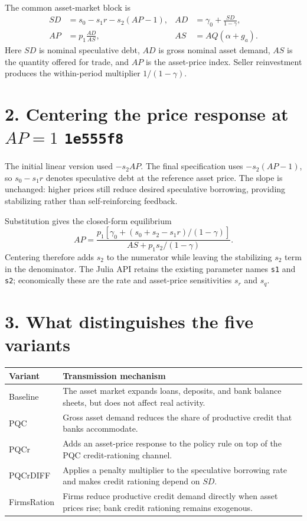\documentclass[10pt,a4paper]{article}
\newcommand{\commit}[1]{\texttt{#1}}
\begin{document}
The common asset-market block is
\begin{align*}
  SD &= s_0-s_1r-s_2(AP-1),
  & AD &= \gamma_0+\frac{SD}{1-\gamma},\\
  AP &= p_1\frac{AD}{AS},
  & AS &= AQ(\alpha+g_a).
\end{align*}
Here $SD$ is nominal speculative debt, $AD$ is gross nominal asset demand,
$AS$ is the quantity offered for trade, and $AP$ is the asset-price index.
Seller reinvestment produces the within-period multiplier $1/(1-\gamma)$.

\section*{2. Centering the price response at $AP=1$ \hfill\normalfont\commit{1e555f8}}

The initial linear version used $-s_2AP$. The final specification uses
$-s_2(AP-1)$, so $s_0-s_1r$ denotes speculative debt at the reference asset
price. The slope is unchanged: higher prices still reduce desired speculative
borrowing, providing stabilizing rather than self-reinforcing feedback.

Substitution gives the closed-form equilibrium
\[
  AP=\frac{p_1\left[\gamma_0+(s_0+s_2-s_1r)/(1-\gamma)\right]}
           {AS+p_1s_2/(1-\gamma)}.
\]
Centering therefore adds $s_2$ to the numerator while leaving the stabilizing
$s_2$ term in the denominator. The Julia API retains the existing parameter
names \texttt{s1} and \texttt{s2}; economically these are the rate and
asset-price sensitivities $s_r$ and $s_q$.

\section*{3. What distinguishes the five variants}

\renewcommand{\arraystretch}{1.05}
\begin{tabularx}{\textwidth}{@{}lX@{}}
  \toprule
  \textbf{Variant} & \textbf{Transmission mechanism} \\
  \midrule
  Baseline & The asset market expands loans, deposits, and bank balance sheets,
  but does not affect real activity. \\
  PQC & Gross asset demand reduces the share of productive credit that banks
  accommodate. \\
  PQCr & Adds an asset-price response to the policy rule on top of the PQC
  credit-rationing channel. \\
  PQCrDIFF & Applies a penalty multiplier to the speculative borrowing rate and
  makes credit rationing depend on $SD$. \\
  FirmsRation & Firms reduce productive credit demand directly when asset prices
  rise; bank credit rationing remains exogenous. \\
  \bottomrule
\end{tabularx}
\end{document}
